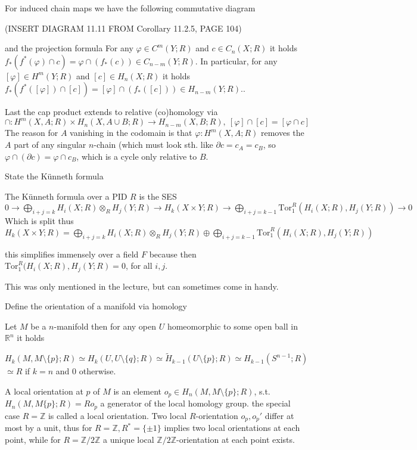 For induced chain maps we have the following commutative diagram

(INSERT DIAGRAM 11.11 FROM Corollary 11.2.5, PAGE 104)

and the projection formula
For any \(\varphi \in C^m(Y; R)\) and \(c \in C_n(X; R)\) it holds
\(
f_* (f^* (\varphi) \cap c) = \varphi \cap (f_*(c)) \in C_{n-m}(Y; R).
\)
In particular, for any \([\varphi] \in H^m(Y; R)\) and \([c] \in H_n(X; R)\) it holds
\(
f_* (f^* ([\varphi]) \cap [c]) = [\varphi] \cap (f_*([c])) \in H_{n-m}(Y; R).
\).

Last the cap product extends to relative (co)homology via
\( \cap : H^m(X, A;R) \times H_n(X, A \cup B;R) \to H_{n-m}(X,B;R),\ [\varphi] \cap [c] = [\varphi \cap c] \)
The reason for \( A \) vanishing in the codomain is that \( \varphi : H^m(X,A;R) \) removes the \( A \) part of any singular \( n \)-chain
(which must look sth. like \( \partial c = c_A = c_B \), so \( \varphi \cap (\partial c) = \varphi \cap c_B \), which is a cycle only relative to \( B \).


State the Künneth formula

The Künneth formula over a PID \( R \)  is the SES
\( 0 \longrightarrow \bigoplus_{i+j=k} H_i(X;R) \otimes_R H_j(Y;R) \longrightarrow H_k(X \times Y;R) \longrightarrow \bigoplus_{i+j=k-1} \text{Tor}_1^R(H_i(X;R), H_j(Y;R)) \longrightarrow 0 \)
Which is split thus
\( H_k(X \times Y;R) = \bigoplus_{i+j=k} H_i(X;R) \otimes_R H_j(Y;R) \oplus \bigoplus_{i+j=k-1} \text{Tor}_1^R(H_i(X;R), H_j(Y;R)) \)

this simplifies immensely over a field \( F \) because then \( \text{Tor}_1^R(H_i(X;R), H_j(Y;R) = 0 \), for all \( i,j \).

This was only mentioned in the lecture, but can sometimes come in handy.



Define the orientation of a manifold via homology


Let \( M \) be a \( n \)-manifold then for any open \( U \) homeomorphic to some open ball in \( \mathbb{R}^n \) it holds

\( H_k(M, M \setminus \{p\}; R) \simeq H_k(U, U \setminus \{q\};R) \simeq \tilde{H}_{k-1}(U \setminus \{p\};R) \simeq H_{k-1}(S^{n-1};R) \)
\( \simeq R \) if \( k = n \) and \( 0 \) otherwise.

A local orientation at \( p \) of \( M \)  is an element \( o_p \in H_n(M, M \setminus \{p\};R) \), s.t. \( H_n(M, M \{p\};R) = Ro_p \)  a generator of the 
local homology group. the special case \( R = \mathbb{Z} \) is called a local orientation.
Two local \( R \)-orientation \( o_p, o_p' \) differ at most by a unit, thus for \( R = \mathbb{Z}, R^\ast = \{\pm 1\} \) implies two local orientations at each point,
while for \( R = \mathbb{Z}/2\mathbb{Z} \) a unique local \( \mathbb{Z}/2\mathbb{Z} \)-orientation at each point exists.

